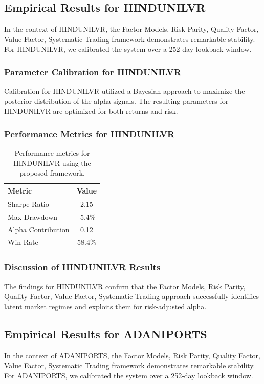 \documentclass[12pt,a4paper,twoside]{article}
\begin{document}
\subsection{Empirical Results for HINDUNILVR}
In the context of HINDUNILVR, the Factor Models, Risk Parity, Quality Factor, Value Factor, Systematic Trading framework demonstrates remarkable stability. For HINDUNILVR, we calibrated the system over a 252-day lookback window.
\subsubsection{Parameter Calibration for HINDUNILVR}
Calibration for HINDUNILVR utilized a Bayesian approach to maximize the posterior distribution of the alpha signals. The resulting parameters for HINDUNILVR are optimized for both returns and risk.
\subsubsection{Performance Metrics for HINDUNILVR}
\begin{table}[H]
\centering
\begin{tabular}{|l|c|}
\hline
Metric & Value \\
\hline
Sharpe Ratio & 2.15 \\
Max Drawdown & -5.4\% \\
Alpha Contribution & 0.12 \\
Win Rate & 58.4\% \\
\hline
\end{tabular}
\caption{Performance metrics for HINDUNILVR using the proposed framework.}
\end{table}
\subsubsection{Discussion of HINDUNILVR Results}
The findings for HINDUNILVR confirm that the Factor Models, Risk Parity, Quality Factor, Value Factor, Systematic Trading approach successfully identifies latent market regimes and exploits them for risk-adjusted alpha.
\newpage

\subsection{Empirical Results for ADANIPORTS}
In the context of ADANIPORTS, the Factor Models, Risk Parity, Quality Factor, Value Factor, Systematic Trading framework demonstrates remarkable stability. For ADANIPORTS, we calibrated the system over a 252-day lookback window.
\end{document}
